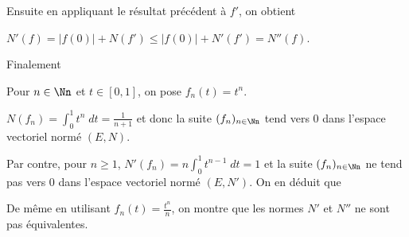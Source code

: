 {{Ensuite en appliquant le résultat précédent à $f'$,  on obtient 

\begin{center}
$N'(f)=|f(0)|+N(f')\leqslant|f(0)|+N'(f')=N''(f)$.
\end{center}

Finalement 

\begin{center}
\end{center}

Pour $n\in\Nn$ et $t\in[0,1]$, on pose $f_n(t) = t^n$. 

$N(f_n)=\int_{0}^{1}t^n\;dt= \frac{1}{n+1}$ et donc la suite $(f_n)_{n\in\Nn}$ tend vers $0$ dans l'espace vectoriel normé $(E,N)$.

Par contre, pour $n\geqslant1$, $N'(f_n)=n\int_{0}^{1}t^{n-1}\;dt=1$ et la suite $(f_n)_{n\in\Nn}$  ne tend pas vers $0$ dans l'espace vectoriel normé $(E,N')$. On en déduit que

\begin{center}
\end{center}

De même en utilisant $f_n(t)= \frac{t^n}{n}$, on montre que les normes $N'$ et $N''$ ne sont pas équivalentes.}
}